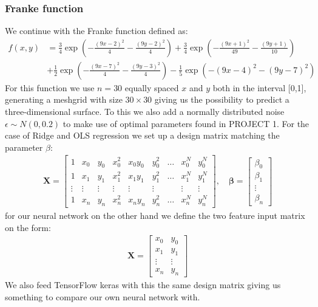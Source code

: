 \documentclass[11pt]{article}
\begin{document}
\subsubsection*{Franke function}
We continue with the Franke function defined as:
\begin{align*}
    f(x,y) & = \frac{3}{4 }\exp\left(- \frac{(9x -2 )^2}{4} - \frac{(9y-2)^2}{4}\right) +\frac{3}{4}\exp{\left(-\frac{(9x+1)^2}{49}- \frac{(9y+1)}{10}\right)} \\
           & +\frac{1}{2}\exp{\left(-\frac{(9x-7)^2}{4} - \frac{(9y-3)^2}{4}\right)} -\frac{1}{5}\exp{\left( -(9x-4)^2 - (9y-7)^2\right) }
\end{align*}
For this function we use $n=30$ equally spaced $x$ and $y$ both in the interval [0,1], generating a meshgrid with size $30 \times 30$ giving us the possibility to predict a three-dimensional surface. To this we also add a normally distributed noise $\epsilon\sim N(0, 0.2)$ to make use of optimal parameters found in PROJECT 1. For the case of Ridge and OLS regression we set up a design matrix matching the parameter $\beta$:
\begin{align*}
    \boldsymbol{X} = \begin{bmatrix}
        1      & x_0    & y_0    & x_0^2  & x_0y_0 & y_0^2  & \hdots & x_0^N  & y_0^N  \\
        1      & x_1    & y_1    & x_1^2  & x_1y_1 & y_1^2  & \hdots & x_1^N  & y_1^N  \\
        \vdots & \vdots & \vdots & \vdots & \vdots & \vdots &        & \vdots & \vdots \\
        1      & x_n    & y_n    & x_n^2  & x_ny_n & y_n^2  & \hdots & x_n^N  & y_n^N
    \end{bmatrix}
    , \quad
    \boldsymbol{\beta} =
    \begin{bmatrix}
        \beta_0 \\
        \beta_1 \\
        \vdots  \\
        \beta_n
    \end{bmatrix}
\end{align*}
for our neural network on the other hand we define the two feature input matrix on the form:
\begin{align*}
    \boldsymbol{X} =
    \begin{bmatrix}
        x_0      & y_0    \\
        x_1      & y_1    \\
        \vdots\  & \vdots \\
        x_n      & y_n
    \end{bmatrix}
\end{align*}
We also feed TensorFlow keras with this the same design matrix giving us something to compare our own neural network with.
\end{document}
